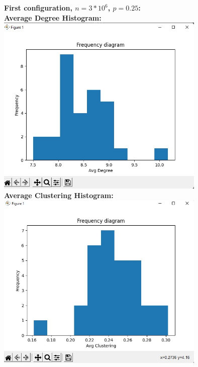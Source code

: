 \documentclass[answers]{exam}
\begin{document}
\begin{questions}
\begin{framed}
\newpage
\textbf{First configuration, $n=3*10^6$, $p=0.25$:}\\
\textbf{Average Degree Histogram:} \\ \includegraphics[width=10cm]{G1 avg degree.jpg}\\
\textbf{Average Clustering Histogram:}\\\includegraphics[width=10cm]{Average Clustering 1.jpg}
\newpage

\end{framed}
\end{questions}
\end{document}
